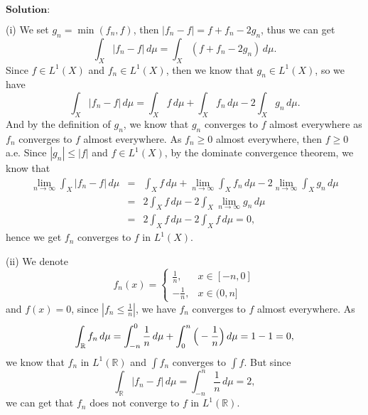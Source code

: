 \documentclass[12pt]{article}
\begin{document}
\vspace{8pt}
$\textbf{Solution:}$

(i) We set $g_{n} = \min(f_{n}, f)$, then $|f_{n} - f| = f + f_{n} - 2 g_{n}$, thus we can get
\begin{equation*}
    \int_{X}^{} |f_{n} - f| \, d \mu = \int_{X}^{} (f + f_{n} - 2 g_{n}) \, d \mu.
\end{equation*}
Since $f \in L^{1}(X)$ and $f_{n} \in L^{1}(X)$, then we know that $g_{n} \in L^{1}(X)$, so we have
\begin{equation*}
    \int_{X}^{} |f_{n} - f| \, d \mu = \int_{X}^{} f \, d \mu + \int_{X}^{} f_{n} \, d \mu - 2 \int_{X}^{} g_{n} \, d \mu.
\end{equation*}
And by the definition of $g_{n}$, we know that $g_{n}$ converges to $f$ almost everywhere as $f_{n}$ converges to $f$ almost everywhere. As $f_{n} \geq 0$ almost everywhere, then $f \geq 0$ a.e. Since $|g_{n}| \leq |f|$ and $f \in L^{1} (X)$, by the dominate convergence theorem, we know that
\begin{eqnarray*}
    \lim_{n \to \infty} \int_{X}^{} |f_{n} - f| \, d \mu & = & \int_{X}^{} f \, d \mu + \lim_{n \to \infty}  \int_{X}^{} f_{n} \, d \mu - 2 \lim_{n \to \infty} \int_{X}^{} g_{n} \, d \mu \\
    & = & 2 \int_{X}^{} f \, d \mu - 2 \int_{X}^{} \lim_{n \to \infty} g_{n} \, d \mu \\
    & = & 2 \int_{X}^{} f \, d \mu - 2 \int_{X}^{} f \, d \mu = 0,
\end{eqnarray*}
hence we get $f_{n}$ converges to $f$ in $L^{1}(X)$.

(ii) We denote
\begin{equation*}
f_{n} (x) =
\left\{
             \begin{array}{cl}
             \frac{1}{n}, & x \in [-n, 0] \\
             - \frac{1}{n}, & x \in (0, n]
             \end{array}
\right.
\end{equation*}
and $f(x) = 0$, since $|f_{n} \leq \frac{1}{n}|$, we have $f_{n}$ converges to $f$ almost everywhere. As
\begin{equation*}
    \int_{\mathbb{R}}^{} f_{n} \, d \mu = \int_{-n}^{0} \frac{1}{n} \, d \mu + \int_{0}^{n} \Big{(} - \frac{1}{n} \Big{)} \, d \mu = 1 - 1 = 0,
\end{equation*}
we know that $f_{n}$ in $L^{1}(\mathbb{R})$ and $\int f_{n}$ converges to $\int f$. But since
\begin{equation*}
    \int_{\mathbb{R}}^{} |f_{n} - f| \, d \mu = \int_{-n}^{n} \frac{1}{n} \, d \mu = 2,
\end{equation*}
we can get that $f_{n}$ does not converge to $f$ in $L^{1}(\mathbb{R})$.
\end{document}
